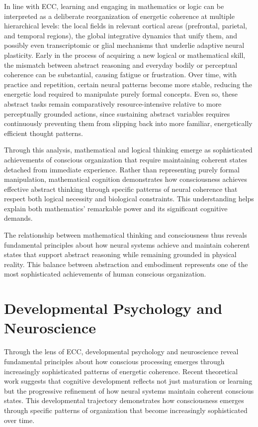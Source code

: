 \begin{refsection}
In line with ECC, learning and engaging in mathematics or logic can be interpreted as a deliberate reorganization of energetic coherence at multiple hierarchical levels: the local fields in relevant cortical areas (prefrontal, parietal, and temporal regions), the global integrative dynamics that unify them, and possibly even transcriptomic or glial mechanisms that underlie adaptive neural plasticity. Early in the process of acquiring a new logical or mathematical skill, the mismatch between abstract reasoning and everyday bodily or perceptual coherence can be substantial, causing fatigue or frustration. Over time, with practice and repetition, certain neural patterns become more stable, reducing the energetic load required to manipulate purely formal concepts. Even so, these abstract tasks remain comparatively resource-intensive relative to more perceptually grounded actions, since sustaining abstract variables requires continuously preventing them from slipping back into more familiar, energetically efficient thought patterns.

Through this analysis, mathematical and logical thinking emerge as sophisticated achievements of conscious organization that require maintaining coherent states detached from immediate experience. Rather than representing purely formal manipulation, mathematical cognition demonstrates how consciousness achieves effective abstract thinking through specific patterns of neural coherence that respect both logical necessity and biological constraints. This understanding helps explain both mathematics' remarkable power and its significant cognitive demands.

The relationship between mathematical thinking and consciousness thus reveals fundamental principles about how neural systems achieve and maintain coherent states that support abstract reasoning while remaining grounded in physical reality. This balance between abstraction and embodiment represents one of the most sophisticated achievements of human conscious organization.

\section{Developmental Psychology and Neuroscience}

Through the lens of ECC, developmental psychology and neuroscience reveal fundamental principles about how conscious processing emerges through increasingly sophisticated patterns of energetic coherence. Recent theoretical work \cite{Bjorklund2014} suggests that cognitive development reflects not just maturation or learning but the progressive refinement of how neural systems maintain coherent conscious states. This developmental trajectory demonstrates how consciousness emerges through specific patterns of organization that become increasingly sophisticated over time.


\end{refsection}
